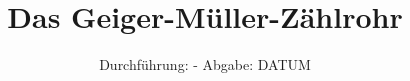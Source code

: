

\subject{V703}
\title{Das Geiger-Müller-Zählrohr}
\date{%
  Durchführung: -
  \hspace{3em}
  Abgabe: DATUM
}



\maketitle
\thispagestyle{empty}
\tableofcontents
\newpage







\printbibliography{}
\nocite{*}


